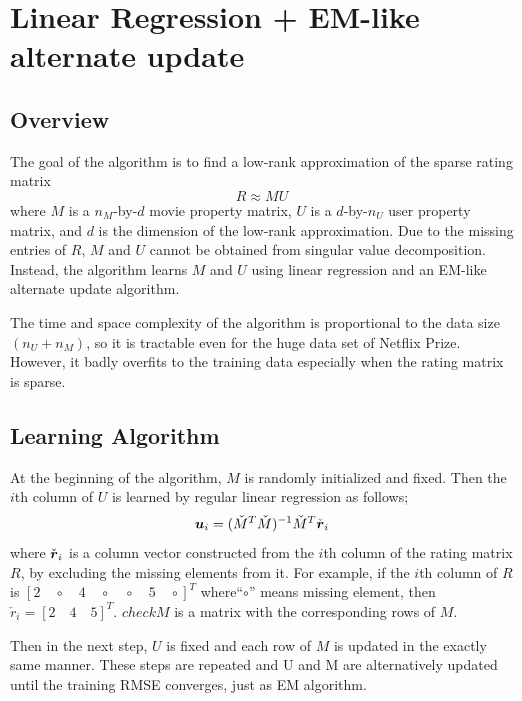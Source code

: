 \documentclass{article}
\begin{document}
\fi

\section{Linear Regression + EM-like alternate update}
\subsection{Overview}
The goal of the algorithm is to find a low-rank approximation of the sparse rating matrix
\begin{equation}
R \approx MU
\end{equation}
where $M$ is a $n_M$-by-$d$ movie property matrix, $U$ is a
$d$-by-$n_U$ user property matrix, and $d$ is the dimension of the
low-rank approximation. Due to the missing entries of $R$, $M$ and $U$
cannot be obtained from singular value decomposition. Instead, the
algorithm learns $M$ and $U$ using linear regression and an EM-like
alternate update algorithm.

The time and space complexity of the algorithm is proportional to the data size $(n_U+n_M)$, so it is tractable even for the huge data set of Netflix Prize. However, it badly overfits to the training data especially when the rating matrix is sparse.

\subsection{Learning Algorithm}

At the beginning of the algorithm, $M$ is randomly initialized and fixed. Then the $i$th column of $U$ is learned by regular linear regression as follows;
\begin{equation}
{ \mbox{\boldmath $u$} }_i=(\check{M}^T\check{M})^{-1}\check{M}^T \check{{ \mbox{\boldmath $r$} }}_i \label{eq:lrem_core}
\end{equation}
where $\check{{ \mbox{\boldmath $r$} }}_i$ is a column vector constructed from the $i$th column of the rating matrix $R$, by excluding the missing elements from it. For example, if the $i$th column of $R$ is $[2 \quad \circ \quad 4 \quad \circ \quad \circ \quad 5 \quad \circ]^T$ where``$\circ$'' means missing element, then $\check{r}_i = [2 \quad 4 \quad 5]^T$. $check{M}$ is a matrix with the corresponding rows of $M$.

Then in the next step, $U$ is fixed and each row of $M$ is updated in the exactly same manner. These steps are repeated and U and M are alternatively updated until the training RMSE converges, just as EM algorithm. 
\end{document}
